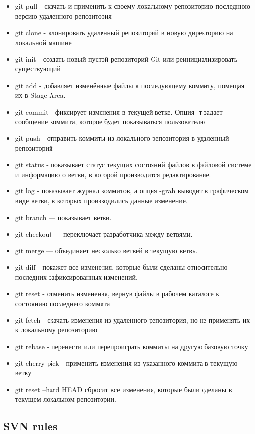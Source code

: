 \begin{itemize}
    \item git pull - скачать и применить к своему локальному репозиторию последнюю версию удаленного репозитория
    \item git clone - клонировать удаленный репозиторий в новую директорию на локальной машине
    \item git init - создать новый пустой репозиторий Git или реинициализировать существующий
    \item git add - добавляет изменённые файлы к последующему коммиту, помещая их в Stage Area.
    \item git commit - фиксирует изменения в текущей ветке. Опция -т задает сообщение коммита, которое будет показываться пользователю
    \item git push - отправить коммиты из локального репозитория в удаленный репозиторий
    \item git status - показывает статус текущих состояний файлов в файловой системе и информацию о ветви, в которой производится редактирование.
    \item git log - показывает журнал коммитов, а опция -grah выводит в графическом виде ветви, в которых производились данные изменение.
    \item git branch — показывает ветви.
    \item git checkout — переключает разработчика между ветвями.
    \item git merge — объединяет несколько ветвей в текущую ветвь.
    \item git diff - покажет все изменения, которые были сделаны относительно последних зафиксированных изменений.
    \item git reset - отменить изменения, вернув файлы в рабочем каталоге к состоянию последнего коммита
    \item git fetch - скачать изменения из удаленного репозитория, но не применять их к локальному репозиторию
    \item git rebase - перенести или перепроиграть коммиты на другую базовую точку
    \item git cherry-pick - применить изменения из указанного коммита в текущую ветку
    \item git reset --hard HEAD сбросит все изменения, которые были сделаны в текущем локальном репозитории.
\end{itemize}


\subsection{SVN rules}

